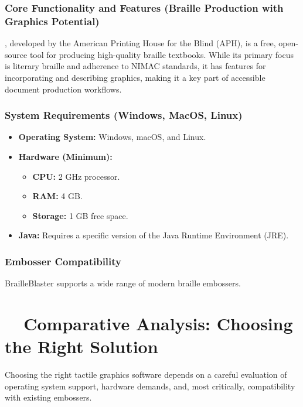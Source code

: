 \subsubsection{Core Functionality and Features (Braille Production with Graphics Potential)}\label{ch14:sssec:brailleblaster-features}
, developed by the American Printing House for the Blind (APH)\supercite{aph-brailleblaster, BrailleBlasterGitHub, brailleblaster-product}, is a free, open-source tool for producing high-quality braille textbooks. While its primary focus is literary braille and adherence to NIMAC standards, it has features for incorporating and describing graphics, making it a key part of accessible document production workflows.

\subsubsection{System Requirements (Windows, MacOS, Linux)}\label{ch14:sssec:brailleblaster-sysreq}
\begin{itemize}
	\item \textbf{Operating System:} Windows, macOS, and Linux.
	\item \textbf{Hardware (Minimum):}
	      \begin{itemize}
		      \item \textbf{CPU:} 2 GHz processor.
		      \item \textbf{RAM:} 4 GB.
		      \item \textbf{Storage:} 1 GB free space.
	      \end{itemize}
	\item \textbf{Java:} Requires a specific version of the Java Runtime Environment (JRE).
\end{itemize}

\subsubsection{Embosser Compatibility}\label{ch14:sssec:brailleblaster-compat}
BrailleBlaster supports a wide range of modern braille embossers\supercite{APHBrailleBlasterFeatures}.

\section{~~Comparative Analysis: Choosing the Right Solution}\label{ch14:sec:comparative-analysis}
Choosing the right tactile graphics software depends on a careful evaluation of operating system support, hardware demands, and, most critically, compatibility with existing embossers.

